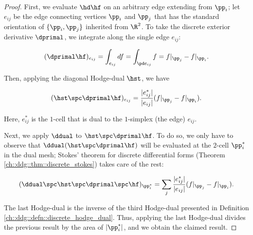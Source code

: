 \begin{proof}
    First, we evaluate $\hd \hf$ on an arbitrary edge extending from $\pp_i$; let $e_{ij}$ be the edge connecting vertices $\pp_i$ and $\pp_j$ that has the standard orientation of $\{\pp_i, \pp_j\}$ inherited from $\R^2$. To take the discrete exterior derivative $\dprimal$, we integrate along the single edge $e_{ij}$:
    
    \begin{align*}
        (\dprimal \hf)_{e_{ij}} = \int_{e_{ij}} df = \int_{\pd e_{ij}} f = f|_{\pp_j} - f|_{\pp_i}.
    \end{align*}
    
    Then, applying the diagonal Hodge-dual $\hst$, we have
    
    \begin{align*}
        (\hst \spc \dprimal \hf)_{e_{ij}} 
        = \frac{|e_{ij}^*|}{|e_{ij}|}(f|_{\pp_j} - f|_{\pp_i}).
    \end{align*}
    
    Here, $e_{ij}^*$ is the $1$-cell that is dual to the $1$-simplex (the edge) $e_{ij}$. 
    
    Next, we apply $\ddual$ to $\hst \spc \dprimal \hf$. To do so, we only have to observe that $\ddual(\hst \spc \dprimal \hf)$ will be evaluated at the $2$-cell $\pp_i^*$ in the dual mesh; Stokes' theorem for discrete differential forms (Theorem \ref{ch::ddg::thm::discrete_stokes}) takes care of the rest:
    
    
    
    
    \begin{align*}
       (\ddual \spc \hst \spc \dprimal \spc \hf)_{\pp_i^*}
       = \sum_j \frac{|e_{ij}^*|}{|e_{ij}|}(f|_{\pp_j} - f|_{\pp_i}).
    \end{align*}
    
    The last Hodge-dual is the inverse of the third Hodge-dual presented in Definition \ref{ch::ddg::defn::discrete_hodge_dual}. Thus, applying the last Hodge-dual divides the previous result by the area of $|\pp_i^*|$, and we obtain the claimed result.
\end{proof}

